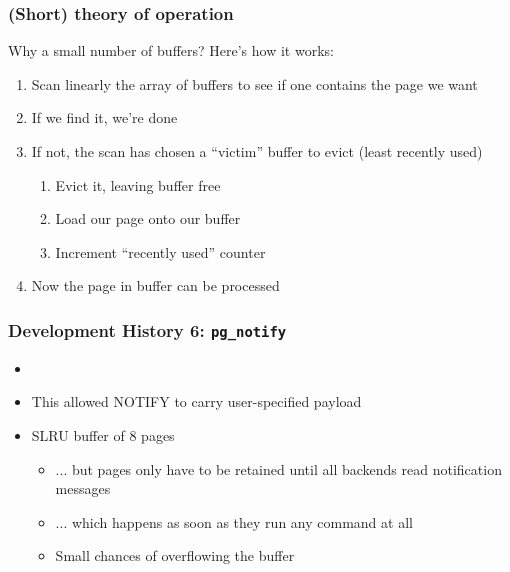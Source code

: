 \begin{frame}
  \frametitle{(Short) theory of operation}
  Why a small number of buffers?  Here's how it works:
  \begin{enumerate}
    \item \alert<2>{Scan linearly the array of buffers} to see if one contains the page we want
    \item If we find it, we're done  %
    \item If not, the scan has chosen a ``victim'' buffer to evict (least recently used)
      \begin{enumerate}
	\item Evict it, leaving buffer free
	\item Load our page onto our buffer
	\item Increment ``recently used'' counter
      \end{enumerate}
    \item Now the page in buffer can be processed 
  \end{enumerate}
\end{frame}

\begin{frame}
  \frametitle{Development History 6: \texttt{pg\_notify}}
  \begin{itemize}
    \item {}
    \item This allowed NOTIFY to carry user-specified payload
    \item SLRU buffer of 8 pages
      \begin{itemize}
	\item ... but pages only have to be retained until all backends read notification messages
	\item ... which happens as soon as they run any command at all
	\item Small chances of overflowing the buffer
      \end{itemize}
  \end{itemize}
\end{frame}

